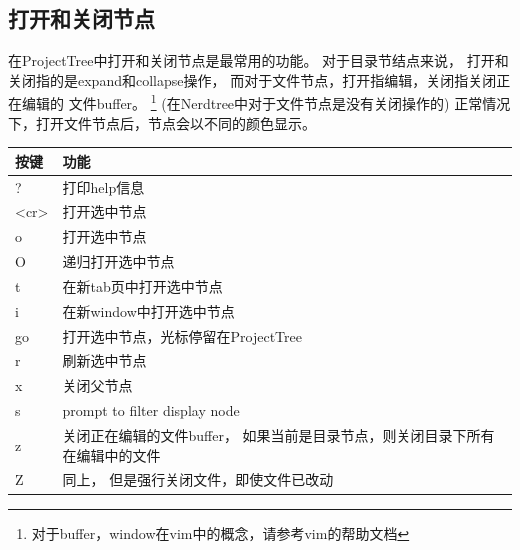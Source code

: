 \documentclass[oneside,openany]{book}
\begin{document}
  \subsection{打开和关闭节点}
  在ProjectTree中打开和关闭节点是最常用的功能。 对于目录节结点来说，
打开和关闭指的是expand和collapse操作， 而对于文件节点，打开指编辑，关闭指关闭正在编辑的
文件buffer。 \footnote{对于buffer，window在vim中的概念，请参考vim的帮助文档}
  \newline
  (在Nerdtree中对于文件节点是没有关闭操作的)
  \newline
  正常情况下，打开文件节点后，节点会以不同的颜色显示。
  \begin{table}[H]
  \centering
      \begin{tabular}{p{40pt}p{220pt}}
        \toprule
        按键& 功能\\
        \midrule
          ?     &打印help信息\\
          <cr>  &打开选中节点\\
          o     &打开选中节点\\
          O     &递归打开选中节点\\
          t     &在新tab页中打开选中节点\\
          i     &在新window中打开选中节点\\
          go    &打开选中节点，光标停留在ProjectTree\\
          r     &刷新选中节点\\
          x     &关闭父节点\\
          s     &prompt to filter display node\\
          z     &关闭正在编辑的文件buffer， 如果当前是目录节点，则关闭目录下所有在编辑中的文件\\
          Z     &同上， 但是强行关闭文件，即使文件已改动\\
      \bottomrule
      \end{tabular}
  \end{table}
\end{document}
